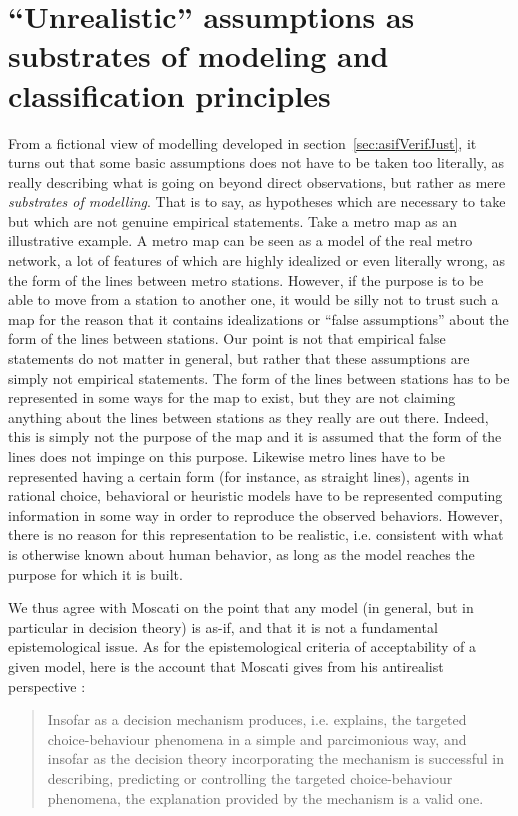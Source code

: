 \documentclass[a4paper,11pt]{article}
\theoremstyle{definition}
\begin{document}
{\section{``Unrealistic'' assumptions as substrates of modeling and classification principles}
\label{sec:epistemo_criterion}
From a fictional view of modelling developed in section~\ref{sec:asifVerifJust}, it turns out that some basic assumptions does not have to be taken too literally, as really describing what is going on beyond direct observations, but rather as mere \textit{substrates of modelling}. That is to say, as hypotheses which are necessary to take but which are not genuine empirical statements. Take a metro map as an illustrative example. A metro map can be seen as a model of the real metro network, a lot of features of which are highly idealized or even literally wrong, as the form of the lines between metro stations. However, if the purpose is to be able to move from a station to another one, it would be silly not to trust such a map for the reason that it contains idealizations or ``false assumptions'' about the form of the lines between stations. Our point is not that empirical false statements do not matter in general, but rather that these assumptions are simply not empirical statements. The form of the lines between stations has to be represented in some ways for the map to exist, but they are not claiming anything about the lines between stations as they really are out there. Indeed, this is simply not the purpose of the map and it is assumed that the form of the lines does not impinge on this purpose. Likewise metro lines have to be represented having a certain form (for instance, as straight lines), agents in rational choice, behavioral or heuristic models have to be represented computing information in some way in order to reproduce the observed behaviors. However, there is no reason for this representation to be realistic, i.e. consistent with what is otherwise known about human behavior, as long as the model reaches the purpose for which it is built. 

We thus agree with Moscati on the point that any model (in general, but in particular in decision theory) is as-if, and that it is not a fundamental epistemological issue. As for the epistemological criteria of acceptability of a given model, here is the account that Moscati gives from his antirealist perspective  \citep[p.~22]{Moscati2023}: 

\begin{quote}
Insofar as a decision mechanism produces, i.e. explains, the targeted choice-behaviour phenomena in a simple and parcimonious way, and insofar as the decision theory incorporating the mechanism is successful \textelp{} in describing, predicting or controlling the targeted choice-behaviour phenomena, the explanation provided by the mechanism is a valid one.
\end{quote}

}
\end{document}
